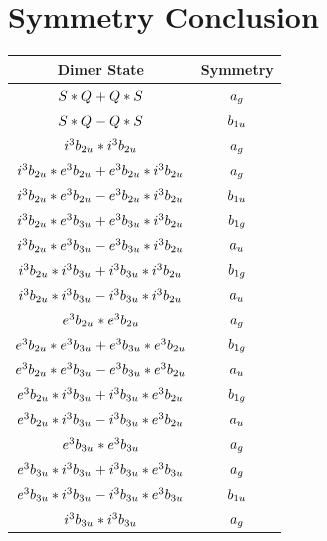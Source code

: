 \documentclass{article}
\begin{document}
\vspace{0.5cm}

\newpage
\newpage

\section{Symmetry Conclusion} 
\begin{table}[ht]
\centering
\begin{tabular}{cc}
\hline
Dimer State & Symmetry \\ [0.1cm] 
\hline
$S * Q + Q * S \displaystyle $ & $a_{g} \displaystyle $ \\ [0.1cm] 
$S * Q - Q * S \displaystyle $ & $b_{1u} \displaystyle $ \\ [0.1cm] 
$i^3 b_{2u} * i^3 b_{2u} \displaystyle $ & $a_{g} \displaystyle $ \\ [0.1cm] 
$i^3 b_{2u} * e^3 b_{2u} + e^3 b_{2u} * i^3 b_{2u} \displaystyle $ & $a_{g} \displaystyle $ \\ [0.1cm] 
$i^3 b_{2u} * e^3 b_{2u} - e^3 b_{2u} * i^3 b_{2u} \displaystyle $ & $b_{1u} \displaystyle $ \\ [0.1cm] 
$i^3 b_{2u} * e^3 b_{3u} + e^3 b_{3u} * i^3 b_{2u} \displaystyle $ & $b_{1g} \displaystyle $ \\ [0.1cm] 
$i^3 b_{2u} * e^3 b_{3u} - e^3 b_{3u} * i^3 b_{2u} \displaystyle $ & $a_{u} \displaystyle $ \\ [0.1cm] 
$i^3 b_{2u} * i^3 b_{3u} + i^3 b_{3u} * i^3 b_{2u} \displaystyle $ & $b_{1g} \displaystyle $ \\ [0.1cm] 
$i^3 b_{2u} * i^3 b_{3u} - i^3 b_{3u} * i^3 b_{2u} \displaystyle $ & $a_{u} \displaystyle $ \\ [0.1cm] 
$e^3 b_{2u} * e^3 b_{2u} \displaystyle $ & $a_{g} \displaystyle $ \\ [0.1cm] 
$e^3 b_{2u} * e^3 b_{3u} + e^3 b_{3u} * e^3 b_{2u} \displaystyle $ & $b_{1g} \displaystyle $ \\ [0.1cm] 
$e^3 b_{2u} * e^3 b_{3u} - e^3 b_{3u} * e^3 b_{2u} \displaystyle $ & $a_{u} \displaystyle $ \\ [0.1cm] 
$e^3 b_{2u} * i^3 b_{3u} + i^3 b_{3u} * e^3 b_{2u} \displaystyle $ & $b_{1g} \displaystyle $ \\ [0.1cm] 
$e^3 b_{2u} * i^3 b_{3u} - i^3 b_{3u} * e^3 b_{2u} \displaystyle $ & $a_{u} \displaystyle $ \\ [0.1cm] 
$e^3 b_{3u} * e^3 b_{3u} \displaystyle $ & $a_{g} \displaystyle $ \\ [0.1cm] 
$e^3 b_{3u} * i^3 b_{3u} + i^3 b_{3u} * e^3 b_{3u} \displaystyle $ & $a_{g} \displaystyle $ \\ [0.1cm] 
$e^3 b_{3u} * i^3 b_{3u} - i^3 b_{3u} * e^3 b_{3u} \displaystyle $ & $b_{1u} \displaystyle $ \\ [0.1cm] 
$i^3 b_{3u} * i^3 b_{3u} \displaystyle $ & $a_{g} \displaystyle $ \\ [0.1cm] 
\hline
\end{tabular}
\end{table}
\end{document}
